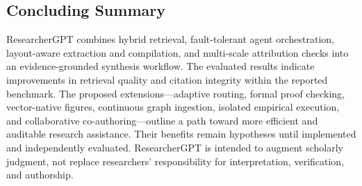 \documentclass[conference]{IEEEtran}
\begin{document}
\subsection{Concluding Summary}
ResearcherGPT combines hybrid retrieval, fault-tolerant agent orchestration, layout-aware extraction and compilation, and multi-scale attribution checks into an evidence-grounded synthesis workflow. The evaluated results indicate improvements in retrieval quality and citation integrity within the reported benchmark. The proposed extensions—adaptive routing, formal proof checking, vector-native figures, continuous graph ingestion, isolated empirical execution, and collaborative co-authoring—outline a path toward more efficient and auditable research assistance. Their benefits remain hypotheses until implemented and independently evaluated. ResearcherGPT is intended to augment scholarly judgment, not replace researchers' responsibility for interpretation, verification, and authorship.
\FloatBarrier
\clearpage
\end{document}
